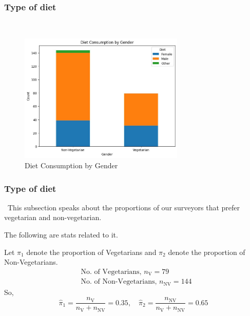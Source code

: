 \documentclass{beamer}
\begin{document}
\begin{frame}
    \frametitle{Type of diet}\
    \begin{figure}
    \centering
    \includegraphics[width=0.7\textwidth]{Veg , Non-veg image.jpg} %
    \caption{Diet Consumption by Gender} %
    \label{fig:Diet Consumption by Gender} %
    \end{figure}
\end{frame}

\begin{frame}
    \frametitle{Type of diet}\
    This subsection speaks about the proportions of our surveyors that prefer vegetarian and non-vegetarian.
    
    The following are stats related to it.
    
    Let $\pi_1$ denote the proportion of Vegetarians and $\pi_2$ denote the proportion of Non-Vegetarians.
    \begin{align}
        &\text{No. of Vegetarians, } n_{\text{V}} = 79 \\
        &\text{No. of Non-Vegetarians, } n_{\text{NV}} = 144 
    \end{align}
    So,
    \begin{equation}
        \hat{\pi}_1 = \frac{n_{\text{V}}}{n_{\text{V}} + n_{\text{NV}}} = 0.35, \quad \hat{\pi}_2 = \frac{n_{\text{NV}}}{n_{\text{V}} + n_{\text{NV}} } = 0.65
    \end{equation}
\end{frame}
\end{document}
